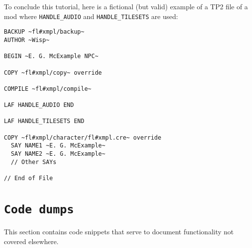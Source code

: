 \documentclass{article}
\def\DEFINE#1{{\tt \bf #1}\label{#1}\index{#1}}
\begin{document}
To conclude this tutorial, here is a fictional (but valid) example of
a TP2 file of a mod where \verb+HANDLE_AUDIO+ and
\verb+HANDLE_TILESETS+ are used:
\begin{verbatim}
BACKUP ~fl#xmpl/backup~
AUTHOR ~Wisp~

BEGIN ~E. G. McExample NPC~

COPY ~fl#xmpl/copy~ override

COMPILE ~fl#xmpl/compile~

LAF HANDLE_AUDIO END

LAF HANDLE_TILESETS END

COPY ~fl#xmpl/character/fl#xmpl.cre~ override
  SAY NAME1 ~E. G. McExample~
  SAY NAME2 ~E. G. McExample~
  // Other SAYs

// End of File
\end{verbatim}



\section{\DEFINE{Code dumps}}
This section contains code snippets that serve to document functionality
not covered elsewhere.
\end{document}
